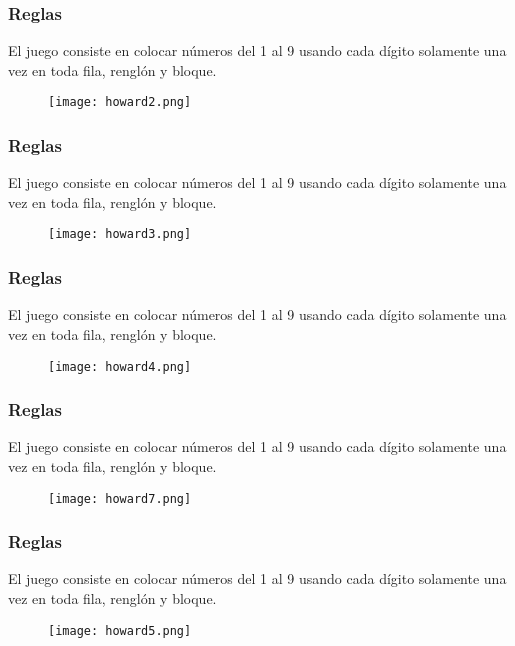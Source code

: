 \documentclass{beamer}
\begin{document}

\begin{frame}
\frametitle{Reglas}
El juego consiste en colocar números del 1 al 9 usando cada dígito solamente una vez en toda fila, renglón y bloque.

\begin{figure}
\centering
  \texttt{[image: howard2.png]}
\end{figure}

\end{frame}


\begin{frame}
\frametitle{Reglas}
El juego consiste en colocar números del 1 al 9 usando cada dígito solamente una vez en toda fila, renglón y bloque.

\begin{figure}
\centering
  \texttt{[image: howard3.png]}
\end{figure}

\end{frame}


\begin{frame}
\frametitle{Reglas}
El juego consiste en colocar números del 1 al 9 usando cada dígito solamente una vez en toda fila, renglón y bloque.

\begin{figure}
\centering
  \texttt{[image: howard4.png]}
\end{figure}

\end{frame}


\begin{frame}
\frametitle{Reglas}
El juego consiste en colocar números del 1 al 9 usando cada dígito solamente una vez en toda fila, renglón y bloque.

\begin{figure}
\centering
  \texttt{[image: howard7.png]}
\end{figure}

\end{frame}


\begin{frame}
\frametitle{Reglas}
El juego consiste en colocar números del 1 al 9 usando cada dígito solamente una vez en toda fila, renglón y bloque.

\begin{figure}
\centering
  \texttt{[image: howard5.png]}
\end{figure}

\end{frame}
\end{document}
